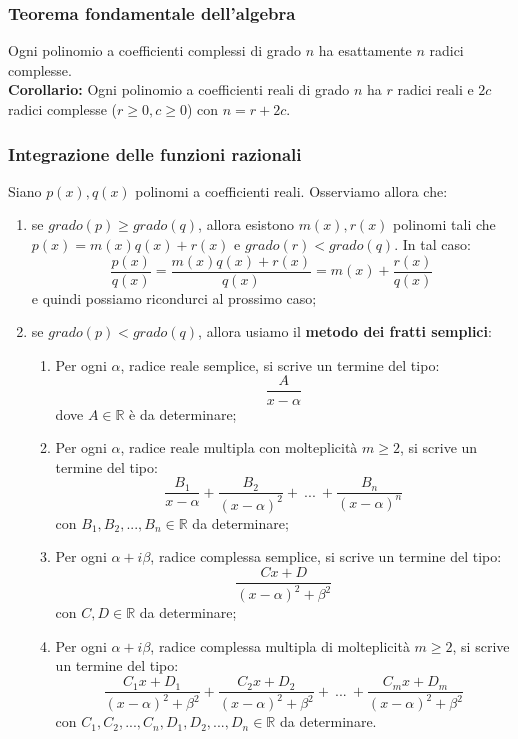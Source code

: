 \documentclass{article}
\begin{document}
\subsubsection{Teorema fondamentale dell'algebra}
Ogni polinomio a coefficienti complessi di grado $n$ ha esattamente $n$ radici complesse.\\

\noindent\textbf{Corollario: } Ogni polinomio a coefficienti reali di grado $n$ ha $r$ radici reali e $2c$ radici complesse ($r \geq 0, c \geq 0$) con $n = r + 2c$.

\subsubsection{Integrazione delle funzioni razionali}
Siano $p(x), q(x)$ polinomi a coefficienti reali. Osserviamo allora che:
\begin{enumerate}
    \item se $grado(p) \geq grado(q)$, allora esistono $m(x), r(x)$ polinomi tali che $p(x) = m(x)q(x) + r(x)$ e $grado(r) < grado(q)$. In tal caso: $$\frac{p(x)}{q(x)} = \frac{m(x)q(x) + r(x)}{q(x)} = m(x) + \frac{r(x)}{q(x)}$$ e quindi possiamo ricondurci al prossimo caso;
    \item se $grado(p) < grado(q)$, allora usiamo il \textbf{metodo dei fratti semplici}:
    \begin{enumerate}
        \item Per ogni $\alpha$, radice reale semplice, si scrive un termine del tipo: $$\frac{A}{x - \alpha}$$ dove $A \in \mathbb{R}$ è da determinare;
        \item Per ogni $\alpha$, radice reale multipla con molteplicità $m \geq 2$, si scrive un termine del tipo: $$\frac{B_1}{x - \alpha} + \frac{B_2}{(x - \alpha)^2} + \ ... \ + \frac{B_n}{(x - \alpha)^n}$$ con $B_1, B_2, ..., B_n \in \mathbb{R}$ da determinare;
        \item Per ogni $\alpha + i\beta$, radice complessa semplice, si scrive un termine del tipo: $$\frac{Cx + D}{(x - \alpha)^2 + \beta^2}$$ con $C, D \in \mathbb{R}$ da determinare;
        \item Per ogni $\alpha + i\beta$, radice complessa multipla di molteplicità $m \geq 2$, si scrive un termine del tipo: $$\frac{C_1x + D_1}{(x - \alpha)^2 + \beta^2} + \frac{C_2x + D_2}{(x - \alpha)^2 + \beta^2} + \ ... \ + \frac{C_mx + D_m}{(x - \alpha)^2 + \beta^2}$$ con $C_1, C_2, ..., C_n, D_1, D_2, ..., D_n \in \mathbb{R}$ da determinare.
    \end{enumerate}
\end{enumerate}
\end{document}

